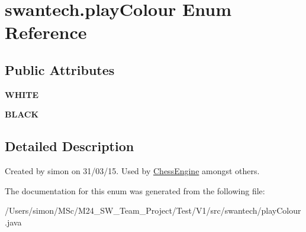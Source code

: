 \hypertarget{enumswantech_1_1play_colour}{}\section{swantech.\+play\+Colour Enum Reference}
\label{enumswantech_1_1play_colour}
\subsection*{Public Attributes}
\begin{DoxyCompactItemize}
\item 
\hypertarget{enumswantech_1_1play_colour_a587d839807532113ab8cc32505352ad3}{}{\bfseries W\+H\+I\+T\+E}\label{enumswantech_1_1play_colour_a587d839807532113ab8cc32505352ad3}

\item 
\hypertarget{enumswantech_1_1play_colour_a51af9e4fd2e4d0355665a65fd68c1c6b}{}{\bfseries B\+L\+A\+C\+K}\label{enumswantech_1_1play_colour_a51af9e4fd2e4d0355665a65fd68c1c6b}

\end{DoxyCompactItemize}


\subsection{Detailed Description}
Created by simon on 31/03/15. Used by \hyperlink{classswantech_1_1_chess_engine}{Chess\+Engine} amongst others. 

The documentation for this enum was generated from the following file\+:\begin{DoxyCompactItemize}
\item 
/\+Users/simon/\+M\+Sc/\+M24\+\_\+\+S\+W\+\_\+\+Team\+\_\+\+Project/\+Test/\+V1/src/swantech/play\+Colour.\+java\end{DoxyCompactItemize}
